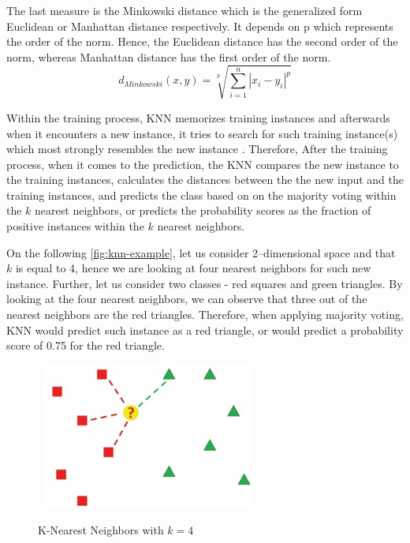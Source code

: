 The last measure is the Minkowski distance which is the generalized form Euclidean or Manhattan distance respectively.
It depends on p which represents the order of the norm. Hence, the Euclidean distance has the second order of the norm, whereas Manhattan distance has the first order of the norm.
\begin{equation}\label{eq}
d_{Minkowski}(x,y) = \sqrt[p]{\sum\limits_{i=1}^{n} |x_i - y_i|^p}
\end{equation}

Within the training process, KNN memorizes training instances and afterwards when it encounters a new instance, it tries to search for such training instance(s) which most strongly resembles the new instance \citep{witten2011data}.
Therefore, After the training process, when it comes to the prediction, the KNN compares the new instance to the training instances, calculates the distances between the the new input and the training instances, and predicts the class based on on the majority voting within the $k$ nearest neighbors, or predicts the probability scores as the fraction of positive instances within the $k$ nearest neighbors.


On the following \autoref{fig:knn-example}, let us consider 2--dimensional space and that $k$ is equal to 4, hence we are looking at four nearest neighbors for such new instance. Further, let us consider two classes - red squares and green triangles.
By looking at the four nearest neighbors, we can observe that three out of the nearest neighbors are the red triangles.
Therefore, when applying majority voting, KNN would predict such instance as a red triangle, or would predict a probability score of 0.75 for the red triangle.

\begin{figure}[H]
    \centering
    \caption{K-Nearest Neighbors with $k=4$}\vspace{0.5em}
    \label{fig:knn-example}\
    \includegraphics[width=70mm]{Figures/KNN_example.jpg}

    \vspace{-1em}
\end{figure}
